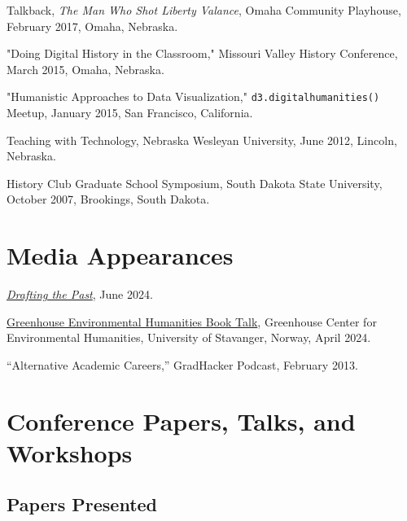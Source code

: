 \documentclass[10pt]{article}
\begin{document}
Talkback, \textit{The Man Who Shot Liberty Valance}, Omaha Community Playhouse, February 2017, Omaha, Nebraska.

"Doing Digital History in the Classroom," Missouri Valley History Conference, March 2015, Omaha, Nebraska.

"Humanistic Approaches to Data Visualization," \texttt{d3.digitalhumanities()} Meetup, January 2015, San Francisco, California.

Teaching with Technology, Nebraska Wesleyan University, June 2012, Lincoln, Nebraska.

History Club Graduate School Symposium, South Dakota State University, October 2007, Brookings, South Dakota.

\section{Media Appearances}

\href{https://draftingthepast.com/podcast-episodes/episode-45-jason-heppler-wants-tools-that-fit-his-questions/}{\textit{Drafting the Past}}, June 2024.

\href{https://vimeo.com/947498919}{Greenhouse Environmental Humanities Book Talk}, Greenhouse Center for Environmental Humanities, University of Stavanger, Norway, April 2024.

``Alternative Academic Careers,'' GradHacker Podcast, February 2013.

\section*{Conference Papers, Talks, and Workshops}

\subsection*{Papers Presented}
\end{document}

